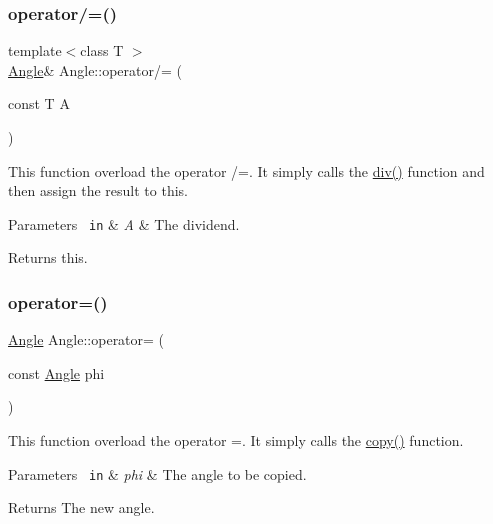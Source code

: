 \subsubsection{\texorpdfstring{operator/=()}{operator/=()}}
{\footnotesize\ttfamily template$<$class T $>$ \\
\mbox{\hyperlink{class_angle}{Angle}}\& Angle\+::operator/= (\begin{DoxyParamCaption}\item[{const T}]{A }\end{DoxyParamCaption})\hspace{0.3cm}{\ttfamily [inline]}}

This function overload the operator /=. It simply calls the {\ttfamily \mbox{\hyperlink{class_angle_accc4f9c0df6965dc1fecab234d30b348}{div()}}} function and then assign the result to this. 
\begin{DoxyParams}[1]{Parameters}
\mbox{\texttt{ in}}  & {\em A} & The dividend. \\
\hline
\end{DoxyParams}
\begin{DoxyReturn}{Returns}
{\ttfamily this}. 
\end{DoxyReturn}
\mbox{\label{class_angle_a93da39f08e2e110e278bb94d1c279ac6}} 
\subsubsection{\texorpdfstring{operator=()}{operator=()}\hspace{0.1cm}{\footnotesize\ttfamily [1/2]}}
{\footnotesize\ttfamily \mbox{\hyperlink{class_angle}{Angle}} Angle\+::operator= (\begin{DoxyParamCaption}\item[{const \mbox{\hyperlink{class_angle}{Angle}}}]{phi }\end{DoxyParamCaption})\hspace{0.3cm}{\ttfamily [inline]}}

This function overload the operator =. It simply calls the {\ttfamily \mbox{\hyperlink{class_angle_ab1c34d25d3235e639313e5d48d98a6f6}{copy()}}} function. 
\begin{DoxyParams}[1]{Parameters}
\mbox{\texttt{ in}}  & {\em phi} & The angle to be copied. \\
\hline
\end{DoxyParams}
\begin{DoxyReturn}{Returns}
The new angle. 
\end{DoxyReturn}
\mbox{\label{class_angle_adf9e68cdeac72b3754bd7d0993a37220}} 
